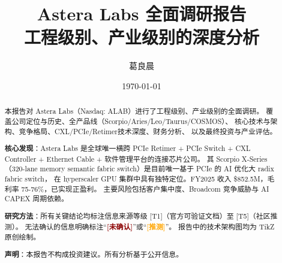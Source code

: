 \documentclass[11pt,a4paper]{ctexart}
\title{\textbf{Astera Labs 全面调研报告}\\[0.3cm]
       \large 工程级别、产业级别的深度分析}
\author{葛良晨}
\date{\today}
\newcommand{\unverified}{{\textcolor{darkred}{\textbf{[未确认]}}}}
\newcommand{\speculation}{{\textcolor{orange}{\textbf{[推测]}}}}
\begin{document}
\maketitle

\begin{abstract}
\noindent 本报告对 Astera Labs（Nasdaq: ALAB）进行了工程级别、产业级别的全面调研。
覆盖公司定位与历史、全产品线（Scorpio/Aries/Leo/Taurus/COSMOS）、
核心技术与架构、竞争格局、CXL/PCIe/Retimer技术深度、财务分析、
以及最终投资与产业评估。

\textbf{核心发现}：Astera Labs 是全球唯一横跨 PCIe Retimer + PCIe Switch + CXL Controller + Ethernet Cable + 软件管理平台的连接芯片公司。
其 Scorpio X-Series（320-lane memory semantic fabric switch）是目前唯一基于 PCIe 的 AI 优化大 radix fabric switch，
在 hyperscaler GPU 集群中具有独特定位。FY2025 收入 \$852.5M，毛利率 75-76\%，已实现正盈利。
主要风险包括客户集中度、Broadcom 竞争威胁与 AI CAPEX 周期依赖。

\textbf{研究方法}：所有关键结论均标注信息来源等级 [T1]（官方可验证文档）至 [T5]（社区推测）。
无法确认的信息明确标注``\unverified{}''或``\speculation{}''。
报告中的技术架构图均为 TikZ 原创绘制。

\textbf{声明}：本报告不构成投资建议。所有分析基于公开信息。
\end{abstract}

\tableofcontents
\clearpage












\end{document}

